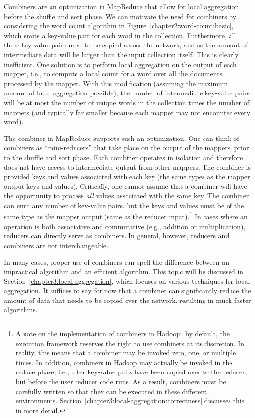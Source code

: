 Combiners are an optimization in MapReduce that allow for local
aggregation before the shuffle and sort phase.  We can motivate the
need for combiners by considering the word count algorithm in
Figure~\ref{chapter2:word-count:basic}, which emits a key-value pair
for each word in the collection.  Furthermore, all these key-value
pairs need to be copied across the network, and so the amount of
intermediate data will be larger than the input collection itself.
This is clearly inefficient.  One solution is to perform local
aggregation on the output of each mapper, i.e., to compute a local
count for a word over all the documents processed by the mapper.  With
this modification (assuming the maximum amount of local aggregation
possible), the number of intermediate key-value pairs will be at most
the number of unique words in the collection times the number of
mappers (and typically far smaller because each mapper may not
encounter every word).

The combiner in MapReduce supports such an optimization.  One can
think of combiners as ``mini-reducers'' that take place on the output
of the mappers, prior to the shuffle and sort phase.  Each combiner
operates in isolation and therefore does not have access to
intermediate output from other mappers.  The combiner is provided keys
and values associated with each key (the same types as the mapper
output keys and values).  Critically, one cannot assume that a
combiner will have the opportunity to process \emph{all} values
associated with the same key.  The combiner can emit any number of
key-value pairs, but the keys and values must be of the same type as
the mapper output (same as the reducer input).\footnote{A note on the
implementation of combiners in Hadoop:\ by default, the execution
framework reserves the right to use combiners at its discretion.  In
reality, this means that a combiner may be invoked zero, one, or
multiple times.  In addition, combiners in Hadoop may actually be
invoked in the reduce phase, i.e., after key-value pairs have been
copied over to the reducer, but before the user reducer code runs.  As
a result, combiners must be carefully written so that they can be
executed in these different environments.
Section~\ref{chapter3:local-aggregation:correctness} discusses this in
more detail.}  In cases where an operation is both associative and
commutative (e.g., addition or multiplication), reducers can directly
serve as combiners.  In general, however, reducers and combiners are
not interchangeable.

In many cases, proper use of combiners can spell the difference
between an impractical algorithm and an efficient algorithm.  This
topic will be discussed in Section~\ref{chapter3:local-aggregation},
which focuses on various techniques for local aggregation.  It
suffices to say for now that a combiner can significantly reduce the
amount of data that needs to be copied over the network, resulting in
much faster algorithms.

